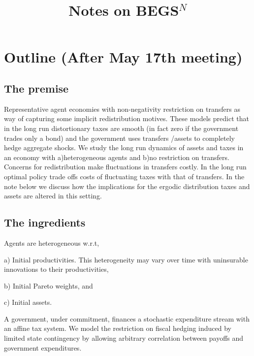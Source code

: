 \documentclass[thmsb,11pt]{article}
\begin{document}
\title{\textbf{ Notes on BEGS$^N$}}
\date{}
\maketitle



\section{Outline (After May 17th meeting)}

\subsection{The premise}
Representative agent economies with non-negativity restriction on transfers as way of capturing some implicit redistribution motives. These models predict that in the long run distortionary taxes are smooth (in fact zero if the government trades only a bond) and the government uses transfers /assets to completely hedge aggregate shocks. 
We study the long run dynamics of assets and taxes in an economy with a)heterogeneous agents and b)no restriction on transfers. Concerns for redistribution make fluctuations in transfers costly. In the long run optimal policy trade offs costs of fluctuating taxes with that of transfers. In the note below we discuss how the implications for the ergodic distribution taxes and assets are altered in this setting.

\subsection{The ingredients}
Agents are heterogeneous w.r.t,

a) Initial productivities. This heterogeneity may vary over time with uninsurable innovations to their productivities, 

b) Initial Pareto weights, and  

c) Initial assets. 

A government, under commitment, finances a stochastic expenditure stream with an affine tax system. We model the restriction on fiscal hedging induced by limited state contingency by allowing arbitrary correlation between payoffs and government expenditures. 
\end{document}
